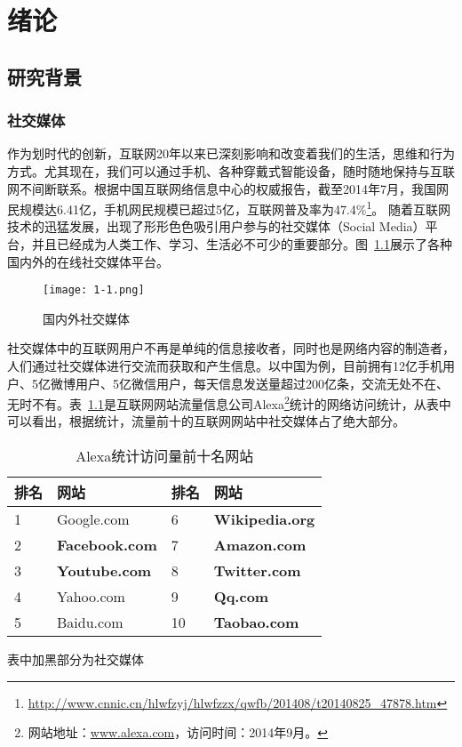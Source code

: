 \chapter{绪论}
\label{Intro}

\section{研究背景}

\subsection{社交媒体}
\label{ch1_social}
作为划时代的创新，互联网20年以来已深刻影响和改变着我们的生活，思维和行为方式。尤其现在，我们可以通过手机、各种穿戴式智能设备，随时随地保持与互联网不间断联系。根据中国互联网络信息中心的权威报告，截至2014年7月，我国网民规模达6.41亿，手机网民规模已超过5亿，互联网普及率为47.4\%\footnote{\url{http://www.cnnic.cn/hlwfzyj/hlwfzzx/qwfb/201408/t20140825\_47878.htm}}。
随着互联网技术的迅猛发展，出现了形形色色吸引用户参与的社交媒体（Social Media）平台，并且已经成为人类工作、学习、生活必不可少的重要部分。图~\ref{fig1-1}展示了各种国内外的在线社交媒体平台。

\begin{figure}[htp]
\centering
\texttt{[image: 1-1.png]}
\caption{国内外社交媒体}
\label{fig1-1}
\end{figure}

社交媒体中的互联网用户不再是单纯的信息接收者，同时也是网络内容的制造者，人们通过社交媒体进行交流而获取和产生信息。以中国为例，目前拥有12亿手机用户、5亿微博用户、5亿微信用户，每天信息发送量超过200亿条，交流无处不在、无时不有。表~\ref{tab1-1}是互联网网站流量信息公司Alexa\footnote{网站地址：\url{www.alexa.com}，访问时间：2014年9月。}统计的网络访问统计，从表中可以看出，根据统计，流量前十的互联网网站中社交媒体占了绝大部分。

\begin{table}[htp]
\centering
\caption{Alexa统计访问量前十名网站}
\label{tab1-1}
\begin{threeparttable}
 \begin{tabular}{|l|l|l|l|}
 \hline
 排名&网站&排名&网站\\
 \hline
 1& Google.com& 6&\textbf{ Wikipedia.org\tnote{1}}\\
 2& \textbf{Facebook.com}& 7& \textbf{Amazon.com}\\
 3& \textbf{Youtube.com}& 8& \textbf{Twitter.com}\\
 4& Yahoo.com& 9& \textbf{Qq.com}\\
 5& Baidu.com& 10& \textbf{Taobao.com}\\
 \hline
\end{tabular}
\begin{tablenotes}
  \centering
  \footnotesize
\item[1]表中加黑部分为社交媒体
\end{tablenotes}
\end{threeparttable}
\end{table}

